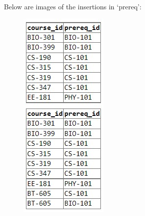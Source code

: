 \documentclass{article}
\begin{document}
Below are images of the insertions in `prereq':
\begin{figure}[!hbt]
    \centering
    \includegraphics[scale=1.3]{pics/insert-pic10.jpg}
    \label{fig:ins10}
\end{figure} 
\end{document}
